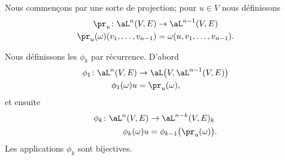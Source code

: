 Nous commençons par une sorte de projection; pour \( u\in V\) nous définissons
\begin{equation}
    \begin{aligned}
        \pr_u\colon \aL^n(V,E)&\to \aL^{n-1}(V,E) \\
        \pr_u(\omega)(v_1,\ldots, v_{n-1})&=\omega(u,v_1,\ldots, v_{n-1}). 
    \end{aligned}
\end{equation}

\begin{lemma}        \label{LEMooTDLNooTcPkLg}
    Nous définissons les \( \phi_k\) par récurrence. D'abord
    \begin{equation}
        \begin{aligned}
            \phi_1\colon \aL^n(V,E)&\to \aL\big( V,\aL^{n-1}(V,E) \big) \\
            \phi_1(\omega)u&=\pr_u(\omega),
        \end{aligned}
    \end{equation}
    et ensuite
    \begin{equation}
        \begin{aligned}
            \phi_k\colon \aL^n(V,E)&\to \aL^{n-k}(V,E)_{k} \\
            \phi_k(\omega)u&=\phi_{k-1}\big( \pr_u(\omega) \big).
        \end{aligned}
    \end{equation}
    Les applications \( \phi_k\) sont bijectives.
\end{lemma}

